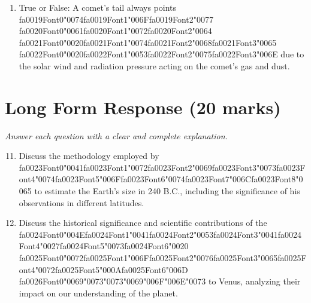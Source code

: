 \documentclass[12pt]{article}
\begin{document}
\begin{enumerate}[label=\arabic*.]
\item True or False: A comet's tail always points {\csname fa0019Font0\endcsname\char"0074}{\csname fa0019Font1\endcsname\char"006F}{\csname fa0019Font2\endcsname\char"0077} {\csname fa0020Font0\endcsname\char"0061}{\csname fa0020Font1\endcsname\char"0072}{\csname fa0020Font2\endcsname\char"0064} {\csname fa0021Font0\endcsname\char"0020}{\csname fa0021Font1\endcsname\char"0074}{\csname fa0021Font2\endcsname\char"0068}{\csname fa0021Font3\endcsname\char"0065} {\csname fa0022Font0\endcsname\char"0020}{\csname fa0022Font1\endcsname\char"0053}{\csname fa0022Font2\endcsname\char"0075}{\csname fa0022Font3\endcsname\char"006E} due to the solar wind and radiation pressure acting on the comet's gas and dust.
\end{enumerate}

\section*{Long Form Response (20 marks)}
\textit{Answer each question with a clear and complete explanation.}
\begin{enumerate}[label=\arabic*.]
\setcounter{enumi}{10}
\item Discuss the methodology employed by {\csname fa0023Font0\endcsname\char"0041}{\csname fa0023Font1\endcsname\char"0072}{\csname fa0023Font2\endcsname\char"0069}{\csname fa0023Font3\endcsname\char"0073}{\csname fa0023Font4\endcsname\char"0074}{\csname fa0023Font5\endcsname\char"006F}{\csname fa0023Font6\endcsname\char"0074}{\csname fa0023Font7\endcsname\char"006C}{\csname fa0023Font8\endcsname\char"0065} to estimate the Earth's size in 240 B.C.,
including the significance of his observations in different latitudes.
\item Discuss the historical significance and scientific contributions of the {\csname fa0024Font0\endcsname\char"004E}{\csname fa0024Font1\endcsname\char"0041}{\csname fa0024Font2\endcsname\char"0053}{\csname fa0024Font3\endcsname\char"0041}{\csname fa0024Font4\endcsname\char"0027}{\csname fa0024Font5\endcsname\char"0073}{\csname fa0024Font6\endcsname\char"0020} {\csname fa0025Font0\endcsname\char"0072}{\csname fa0025Font1\endcsname\char"006F}{\csname fa0025Font2\endcsname\char"0076}{\csname fa0025Font3\endcsname\char"0065}{\csname fa0025Font4\endcsname\char"0072}{\csname fa0025Font5\endcsname\char"000A}{\csname fa0025Font6\endcsname\char"006D}
{\csname fa0026Font0\endcsname\char"0069}{\char"0073}{\char"0073}{\char"0069}{\char"006F}{\char"006E}{\char"0073} to Venus, analyzing their impact on our understanding of the planet.
\end{enumerate}
\end{document}
